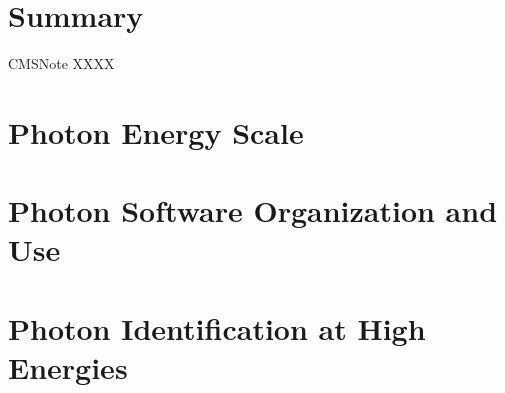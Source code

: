 \documentclass{cmspaper}
\begin{document}
\section{Summary}

\begin{thebibliography}{9}
  CMSNote XXXX


\end{thebibliography}
 
\pagebreak
\appendix
\section{Photon Energy Scale}

\section{Photon Software Organization and Use}

\section{Photon Identification at High Energies}
\end{document}
